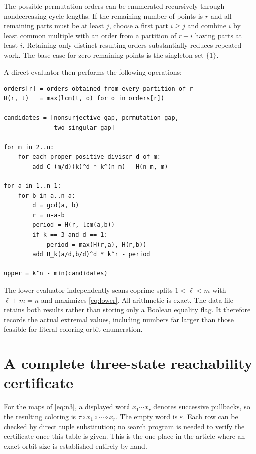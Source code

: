 \documentclass[11pt,a4paper]{article}
\numberwithin{equation}{section}
\theoremstyle{definition}
\theoremstyle{remark}
\begin{document}
The possible permutation orders can be enumerated recursively through
nondecreasing cycle lengths. If the remaining number of points is $r$ and
all remaining parts must be at least $j$, choose a first part $i\ge j$ and
combine $i$ by least common multiple with an order from a partition of
$r-i$ having parts at least $i$. Retaining only distinct resulting orders
substantially reduces repeated work. The base case for zero remaining
points is the singleton set $\{1\}$.

A direct evaluator then performs the following operations:
\begin{lstlisting}
orders[r] = orders obtained from every partition of r
H(r, t)   = max(lcm(t, o) for o in orders[r])

candidates = [nonsurjective_gap, permutation_gap,
              two_singular_gap]

for m in 2..n:
    for each proper positive divisor d of m:
        add C_(m/d)(k)^d * k^(n-m) - H(n-m, m)

for a in 1..n-1:
    for b in a..n-a:
        d = gcd(a, b)
        r = n-a-b
        period = H(r, lcm(a,b))
        if k == 3 and d == 1:
            period = max(H(r,a), H(r,b))
        add B_k(a/d,b/d)^d * k^r - period

upper = k^n - min(candidates)
\end{lstlisting}

The lower evaluator independently scans coprime splits $1<\ell<m$ with
$\ell+m=n$ and maximizes \eqref{eq:lower}. All arithmetic is exact. The data
file retains both results rather than storing only a Boolean equality flag.
It therefore records the actual extremal values, including numbers far
larger than those feasible for literal coloring-orbit enumeration.

\section{A complete three-state reachability certificate}\label{app:words}

For the maps of \eqref{eq:n3}, a displayed word $x_1\cdots x_r$ denotes
successive pullbacks, so the resulting coloring is
$\tau\circ x_1\circ\cdots\circ x_r$. The empty word is $\varepsilon$.
Each row can be checked by direct tuple substitution; no search program is
needed to verify the certificate once this table is given. This is the one
place in the article where an exact orbit size is established entirely by
hand.
\end{document}
